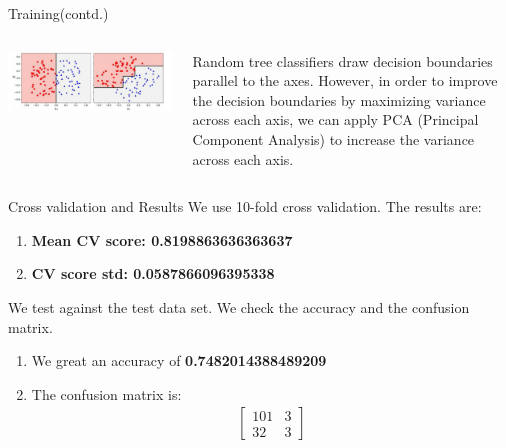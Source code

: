 \begin{frame}{Training(contd.)}
   \begin{columns}[T]
    \begin{column}{0.6\textwidth}
      \includegraphics[width=1\textwidth]{images/PCA_for_RF.png}
    \end{column}
    \begin{column}{0.4\textwidth}
    Random tree classifiers draw decision boundaries parallel to the axes. However, in order to improve the decision boundaries by maximizing variance across each axis, we can apply PCA (Principal Component Analysis) to increase the variance across each axis.
    \end{column}
  \end{columns}
\end{frame}
\begin{frame}{Cross validation and Results}
We use 10-fold cross validation. The results are:
\begin{enumerate}[$\bullet$]
    \item \textbf{Mean CV score: 0.8198863636363637}\pause
    \item \textbf{CV score std: 0.0587866096395338}\pause
\end{enumerate}
We test against the test data set. We check the accuracy and the confusion matrix.
\begin{enumerate}[$\bullet$]
    \item We great an accuracy of \textbf{0.7482014388489209}\pause
    \item The confusion matrix is:
    \begin{align*}
    \begin{bmatrix}
    101&3\\
    32&3
    \end{bmatrix}
    \end{align*}
 \end{enumerate}
\end{frame}


